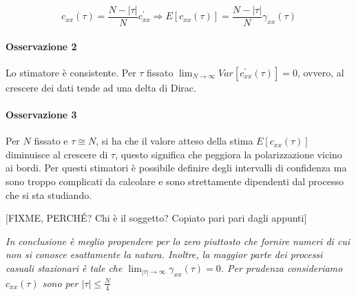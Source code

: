   \[ c_{xx}(\tau)=\frac{N-|\tau |}{N}c_{xx}^{'} \Longrightarrow E[c_{xx}(\tau )]=\frac{N-|\tau |}{N}\gamma_{xx}(\tau )\]
  
\paragraph{Osservazione 2} Lo stimatore è consistente. Per $\tau$ fissato $\lim_{N\rightarrow\infty}{Var[c_{xx}^{'}(\tau )]}=0$, ovvero, al crescere dei dati tende ad una delta di Dirac.
\paragraph{Osservazione 3} Per $N$ fissato e $\tau\cong N$, si ha che il valore atteso della stima $E[c_{xx}(\tau )]$ diminuisce al crescere di $\tau$, questo significa che peggiora la polarizzazione vicino ai bordi.\newline\newline
Per questi stimatori è possibile definire degli intervalli di confidenza ma sono troppo complicati da calcolare e sono strettamente dipendenti dal processo che si sta studiando.\newline

\begin{center}[FIXME, PERCHÉ? Chi è il soggetto? Copiato pari pari dagli appunti]\end{center}
\textit{In conclusione è meglio propendere per lo zero piuttosto che fornire numeri di cui non si conosce esattamente la natura. Inoltre, la maggior parte dei processi casuali stazionari è tale che $\lim_{|\tau|\rightarrow\infty}{\gamma_{xx}(\tau)}=0$. Per prudenza consideriamo $c_{xx}(\tau)$ sono per $|\tau|\leq \frac{N}{4}$}
